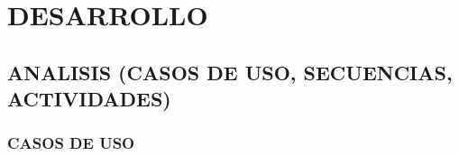 \section{DESARROLLO} 
\subsection{ANALISIS (CASOS DE USO, SECUENCIAS, ACTIVIDADES)}
\subsubsection{CASOS DE USO}
		


